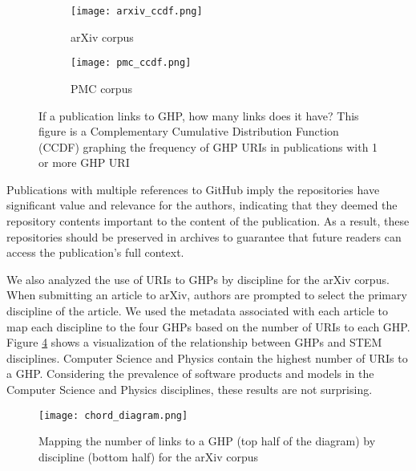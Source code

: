 \begin{figure}[htbp]
\centering
\begin{subfigure}{\textwidth}
    \texttt{[image: arxiv\_ccdf.png]}
    \caption{arXiv corpus}
    \label{fig:arxiv_ccdf}
\end{subfigure}
\hfill
\begin{subfigure}{\textwidth}
    \texttt{[image: pmc\_ccdf.png]}
    \caption{PMC corpus}
    \label{fig:pmc_ccdf}
\end{subfigure}
        
\caption{If a publication links to GHP, how many links does it have? This figure is a Complementary Cumulative Distribution Function (CCDF) graphing the frequency of GHP URIs in publications with 1 or more GHP URI}
\label{fig:ccdf}
\end{figure}

Publications with multiple references to GitHub imply the repositories have significant value and relevance for the authors, indicating that they deemed the repository contents important to the content of the publication. As a result, these repositories should be preserved in archives to guarantee that future readers can access the publication's full context.

We also analyzed the use of URIs to GHPs by discipline for the arXiv corpus. When submitting an article to arXiv, authors are prompted to select the primary discipline of the article. We used the metadata associated with each article to map each discipline to the four GHPs based on the number of URIs to each GHP. Figure \ref{fig:chord_diagram} shows a visualization of the relationship between GHPs and STEM disciplines. Computer Science and Physics contain the highest number of URIs to a GHP. Considering the prevalence of software products and models in the Computer Science and Physics disciplines, these results are not surprising.

\begin{figure}
    \centering
    \texttt{[image: chord\_diagram.png]}
    \caption{Mapping the number of links to a GHP (top half of the diagram) by discipline (bottom half) for the arXiv corpus}
    \label{fig:chord_diagram}
\end{figure}